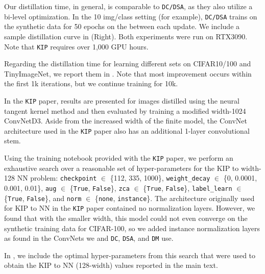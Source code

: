 Our distillation time, in general, is comparable to \texttt{DC/DSA}, as they also utilize a bi-level optimization. In the 10 img/class setting (for example), \texttt{DC/DSA} trains on the synthetic data for 50 epochs on the between each update. We include a sample distillation curve in  (Right). Both experiments were run on RTX3090. Note that  \texttt{KIP} requires over 1,000 GPU hours.

Regarding the distillation time for learning different sets on CIFAR10/100 and TinyImageNet, we report them in . Note that most improvement occurs within the first 1k iterations, but we continue training for 10k.


In the \texttt{KIP} paper, results are presented for images distilled using the neural tangent kernel method and then evaluated by training a modified width-1024 ConvNetD3. Aside from the increased width of the finite model, the ConvNet architecture used in the \texttt{KIP} paper also has an additional 1-layer convolutional stem.

Using the training notebook provided with the \texttt{KIP} paper, we perform an exhaustive search over a reasonable set of hyper-parameters for the KIP to width-128 NN problem: \texttt{checkpoint} $\in$ \{112, 335, 1000\}, \texttt{weight\_decay} $\in $ \{0, 0.0001, 0.001, 0.01\}, \texttt{aug} $\in$ \{\texttt{True}, \texttt{False}\}, \texttt{zca} $\in$ \{\texttt{True}, \texttt{False}\}, \texttt{label\_learn} $\in$ \{\texttt{True}, \texttt{False}\}, and \texttt{norm} $\in$ \{\texttt{none}, \texttt{instance}\}. The architecture originally used for KIP to NN in the \texttt{KIP} paper contained no normalization layers. However, we found that with the smaller width, this model could not even converge on the synthetic training data for CIFAR-100, so we added instance normalization layers as found in the ConvNets we and \texttt{DC}, \texttt{DSA}, and \texttt{DM} use.

In , we include the optimal hyper-parameters from this search that were used to obtain the KIP to NN (128\nobreakdash-width) values reported in the main text.









